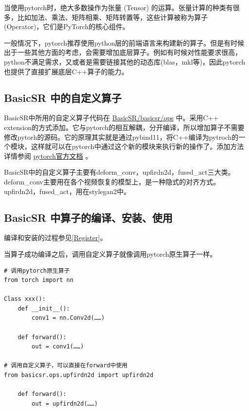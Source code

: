 \documentclass[../main.tex]{subfiles}
\begin{document}
当使用pytorch时，绝大多数操作为张量 (Tensor) 的运算。张量计算的种类有很多，比如加法、乘法、矩阵相乘、矩阵转置等，这些计算被称为算子 (Operator)，它们是PyTorch的核心组件。

一般情况下，pytorch推荐使用python层的前端语言来构建新的算子。但是有时候出于一些其他方面的考虑，会需要增加底层算子。例如有时候对性能要求很高，python不满足需求，又或者是需要链接其他的动态库(blas，mkl等)，因此pytorch也提供了直接扩展底层C++算子的能力。

\subsection{BasicSR 中的自定义算子}

BasicSR中所用的自定义算子代码在 \href{https://github.com/XPixelGroup/BasicSR/tree/master/basicsr/ops}{BasicSR/basicsr/ops} 中。采用C++ extension的方式添加。它与pytorch的相互解耦，分开编译，所以增加算子不需要修改pytorh的源码。它的原理其实就是通过pybind11，将C++编译为pytroch的一个模块，这样就可以在pytorch中通过这个新的模块来执行新的操作了。添加方法详情参阅 \href{https://pytorch.org/tutorials/advanced/cpp_extension.html#writing-a-mixed-c-cuda-extension}{pytorch官方文档} 。

BasicSR中的自定义算子主要有deform\_conv，upfirdn2d，fused\_act三大类。deform\_conv主要用在各个视频恢复的模型上，是一种隐式的对齐方式。upfirdn2d，fused\_act，用在stylegan2中。

\subsection{BasicSR 中算子的编译、安装、使用}

\begin{note} %
    编译和安装的过程参见\ref{Register}。
\end{note}

当算子成功编译之后，调用自定义算子就像调用pytorch原生算子一样。


\begin{verbatim}
# 调用pytorch原生算子
from torch import nn

Class xxx():
    def __init__():
        conv1 = nn.Conv2d(……)

    def forward():
        out = conv1(……)

# 调用自定义算子，可以直接在forward中使用
from basicsr.ops.upfirdn2d import upfirdn2d

    def forward():
        out = upfirdn2d(……)

\end{verbatim}
\end{document}
